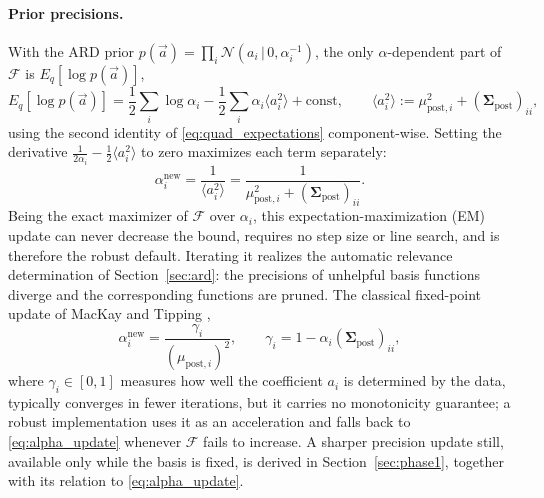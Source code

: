 \documentclass{article}
\begin{document}
\paragraph{Prior precisions.} With the ARD prior $p(\vec a) = \prod_i \mathcal N(a_i\,|\,0,\alpha_i^{-1})$, the only $\alpha$-dependent part of $\mathcal F$ is $E_q[\log p(\vec a)]$,
\begin{equation}
    E_q[\log p(\vec a)] = \frac12\sum_i \log\alpha_i - \frac12 \sum_i \alpha_i \langle a_i^2\rangle + \text{const}, \qquad
    \langle a_i^2\rangle := \mu_{\text{post},i}^2 + (\mathbf{\Sigma}_{\text{post}})_{ii},
\end{equation}
using the second identity of \eqref{eq:quad_expectations} component-wise. Setting the derivative $\frac{1}{2\alpha_i} - \frac{1}{2}\langle a_i^2\rangle$ to zero maximizes each term separately:
\begin{equation}
    \alpha_i^{\text{new}} = \frac{1}{\langle a_i^2\rangle} = \frac{1}{\mu_{\text{post},i}^2 + (\mathbf{\Sigma}_{\text{post}})_{ii}}. \label{eq:alpha_update}
\end{equation}
Being the exact maximizer of $\mathcal F$ over $\alpha_i$, this expectation-maximization (EM) update can never decrease the bound, requires no step size or line search, and is therefore the robust default. Iterating it realizes the automatic relevance determination of Section~\ref{sec:ard}: the precisions of unhelpful basis functions diverge and the corresponding functions are pruned. The classical fixed-point update of MacKay and Tipping \cite{mackay1992bayesian,tipping2001sparse},
\begin{equation}
    \alpha_i^{\text{new}} = \frac{\gamma_i}{(\mu_{\text{post},i})^2}, \qquad
    \gamma_i = 1 - \alpha_i (\mathbf{\Sigma}_{\text{post}})_{ii}, \label{eq:mackay_updates}
\end{equation}
where $\gamma_i \in [0,1]$ measures how well the coefficient $a_i$ is determined by the data, typically converges in fewer iterations, but it carries no monotonicity guarantee; a robust implementation uses it as an acceleration and falls back to \eqref{eq:alpha_update} whenever $\mathcal F$ fails to increase. A sharper precision update still, available only while the basis is fixed, is derived in Section~\ref{sec:phase1}, together with its relation to \eqref{eq:alpha_update}.
\end{document}
